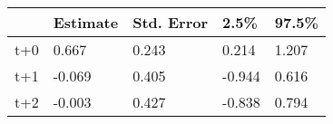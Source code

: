 \begin{tabular}{lllll}
  \toprule
  & Estimate & Std. Error & 2.5\% & 97.5\% \\ 
  \midrule
t+0 & 0.667 & 0.243 & 0.214 & 1.207 \\ 
  t+1 & -0.069 & 0.405 & -0.944 & 0.616 \\ 
  t+2 & -0.003 & 0.427 & -0.838 & 0.794 \\ 
   \bottomrule
\end{tabular}
